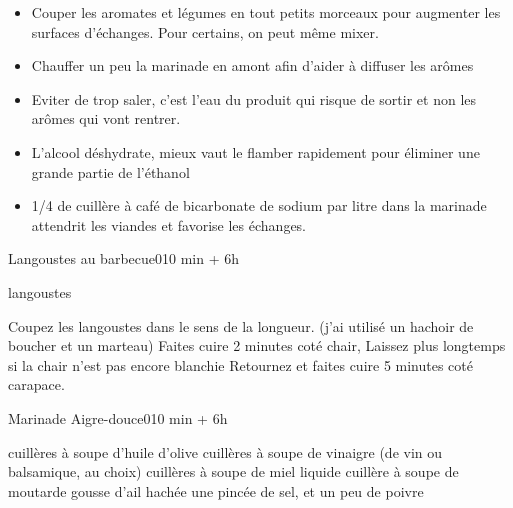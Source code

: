{\renewcommand{\section}[1]{}

\section{Optimiser une marinade}
\begin{itemize}
\item Couper les aromates et légumes en tout petits morceaux pour augmenter les surfaces d'échanges. Pour certains, on peut même mixer. 
\item Chauffer un peu la marinade en amont afin d'aider à diffuser les arômes
\item Eviter de trop saler, c'est l'eau du produit qui risque de sortir et non les arômes qui vont rentrer. 
\item L'alcool déshydrate, mieux vaut le flamber rapidement pour éliminer une grande partie de l'éthanol
\item 1/4 de cuillère à café  de bicarbonate de sodium par litre dans la marinade attendrit les viandes et favorise les échanges. 
\end{itemize}

\section{Langoustes au barbecue}
\begin{recette}{Langoustes au barbecue}{0}{10 min + 6h}{}
\begin{ingredients}
\ingredient langoustes
\end{ingredients}

\begin{preparation}
\etape Coupez les langoustes dans le sens de la longueur. (j'ai utilisé un hachoir de boucher et un marteau)
\etape Faites cuire 2 minutes coté chair, Laissez plus longtemps si la chair n'est pas encore blanchie
\etape Retournez et faites cuire 5 minutes coté carapace.
\end{preparation}
\end{recette}

\section{Marinade Aigre-douce}
\begin{recette}{Marinade Aigre-douce}{0}{10 min + 6h}{}
\begin{ingredients}
 cuillères à soupe d'huile d'olive
 cuillères à soupe de vinaigre (de vin ou balsamique, au choix)
 cuillères à soupe de miel liquide
 cuillère à soupe de moutarde
 gousse d'ail hachée
\ingredient une pincée de sel, et un peu de poivre
\end{ingredients}


\end{recette}}
